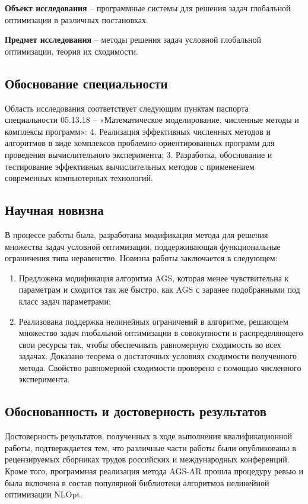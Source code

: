 \textbf{Объект исследования} -- программные системы для решения задач глобальной оптимизации в различных постановках.

\textbf{Предмет исследования} -- методы решения задач условной глобальной оптимизации, теория их сходимости.

\subsection*{Обоснование специальности}

Область исследования соответствует следующим пунктам паспорта специальности 05.13.18 --
«Математическое моделирование, численные методы и комплексы программ»:
4. Реализация эффективных численных методов и алгоритмов в виде
комплексов проблемно-ориентированных программ для проведения
вычислительного эксперимента; 3. Разработка, обоснование и тестирование эффективных вычислительных
методов с применением современных компьютерных технологий.

\subsection*{Научная новизна}

В процессе работы была, разработана модификация метода для решения множества задач условной оптимизации, поддерживающая
функциональные ограничения типа неравенство.
Новизна работы заключается в следующем:

\begin{enumerate}
    \item Предложена модификация алгоритма AGS, которая менее чувствительна к параметрам и сходится так же быстро, как AGS
    с заранее подобранными под класс задач параметрами;
    \item Реализована поддержка нелинейных ограничений в алгоритме, решающeм
    множество задач глобальной оптимизации в совокупности и распределяющего свои ресурсы так, чтобы
    обеспечивать равномерную сходимость во всех задачах. Доказано теорема о достаточных условиях сходимости
    полученного метода. Свойство равномерной сходимости проверено с помощью численного эксперимента.
\end{enumerate}

\subsection*{Обоснованность и достоверность результатов}
Достоверность результатов, полученных в ходе выполнения квалификационной работы, подтверждается
тем, что различные части работы были опубликованы в рецензируемых сборниках трудов российских и международных конференций.
Кроме того, программная реализация метода AGS-AR прошла процедуру ревью и была включена в состав популярной библиотеки
алгоритмов нелинейной оптимизации NLOpt.

